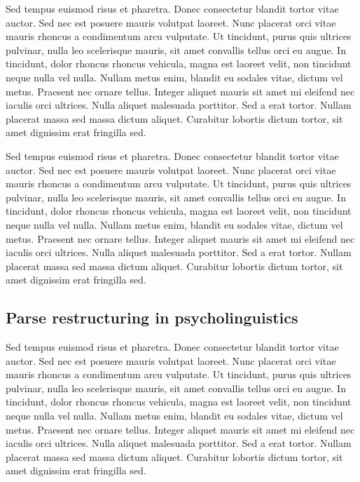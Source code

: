 \documentclass[11pt,letterpaper]{article}
\begin{document}
Sed tempus euismod risus et pharetra. Donec consectetur blandit tortor vitae auctor. Sed nec est posuere mauris volutpat laoreet. Nunc placerat orci vitae mauris rhoncus a condimentum arcu vulputate. Ut tincidunt, purus quis ultrices pulvinar, nulla leo scelerisque mauris, sit amet convallis tellus orci eu augue. In tincidunt, dolor rhoncus rhoncus vehicula, magna est laoreet velit, non tincidunt neque nulla vel nulla. Nullam metus enim, blandit eu sodales vitae, dictum vel metus. Praesent nec ornare tellus. Integer aliquet mauris sit amet mi eleifend nec iaculis orci ultrices. Nulla aliquet malesuada porttitor. Sed a erat tortor. Nullam placerat massa sed massa dictum aliquet. Curabitur lobortis dictum tortor, sit amet dignissim erat fringilla sed.

Sed tempus euismod risus et pharetra. Donec consectetur blandit tortor vitae auctor. Sed nec est posuere mauris volutpat laoreet. Nunc placerat orci vitae mauris rhoncus a condimentum arcu vulputate. Ut tincidunt, purus quis ultrices pulvinar, nulla leo scelerisque mauris, sit amet convallis tellus orci eu augue. In tincidunt, dolor rhoncus rhoncus vehicula, magna est laoreet velit, non tincidunt neque nulla vel nulla. Nullam metus enim, blandit eu sodales vitae, dictum vel metus. Praesent nec ornare tellus. Integer aliquet mauris sit amet mi eleifend nec iaculis orci ultrices. Nulla aliquet malesuada porttitor. Sed a erat tortor. Nullam placerat massa sed massa dictum aliquet. Curabitur lobortis dictum tortor, sit amet dignissim erat fringilla sed.

\subsection{Parse restructuring in psycholinguistics}

Sed tempus euismod risus et pharetra. Donec consectetur blandit tortor vitae auctor. Sed nec est posuere mauris volutpat laoreet. Nunc placerat orci vitae mauris rhoncus a condimentum arcu vulputate. Ut tincidunt, purus quis ultrices pulvinar, nulla leo scelerisque mauris, sit amet convallis tellus orci eu augue. In tincidunt, dolor rhoncus rhoncus vehicula, magna est laoreet velit, non tincidunt neque nulla vel nulla. Nullam metus enim, blandit eu sodales vitae, dictum vel metus. Praesent nec ornare tellus. Integer aliquet mauris sit amet mi eleifend nec iaculis orci ultrices. Nulla aliquet malesuada porttitor. Sed a erat tortor. Nullam placerat massa sed massa dictum aliquet. Curabitur lobortis dictum tortor, sit amet dignissim erat fringilla sed.
\end{document}
